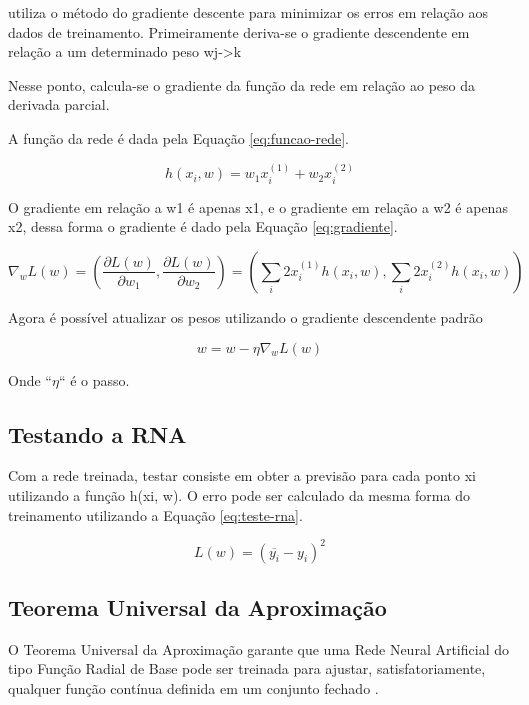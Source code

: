  utiliza o método do gradiente descente para minimizar os erros em relação aos dados de treinamento. Primeiramente deriva-se o gradiente descendente em relação a um determinado peso wj->k

Nesse ponto, calcula-se o gradiente da função da rede em relação ao peso da derivada parcial. 

A função da rede é dada pela Equação \ref{eq:funcao-rede}.

\begin{equation}
\label{eq:funcao-rede}
    h(x_i,w) = w_1x_i^{(1)} + w_2x_i^{(2)}
\end{equation}

O gradiente em relação a w1 é apenas x1, e o gradiente em relação a w2 é apenas x2, dessa forma o gradiente é dado pela Equação \ref{eq:gradiente}.

\begin{equation}
\label{eq:gradiente}
    \nabla_wL(w) = \left( \frac{\partial L(w)}{\partial w_1}, \frac{\partial L(w)}{\partial w_2} \right) = \left( \sum_i 2x_i ^{(1)} h(x_i,w), \sum_i 2x_i ^{(2)} h(x_i,w) \right)
\end{equation}

Agora é possível atualizar os pesos utilizando o gradiente descendente padrão

\begin{equation}
    w = w -\eta \nabla_w L(w)
\end{equation}

Onde ``$\eta$`` é o passo.

\subsection{Testando a RNA}

Com a rede treinada, testar consiste em obter a previsão para cada ponto xi utilizando a função h(xi, w). O erro pode ser calculado da mesma forma do treinamento utilizando a Equação \ref{eq:teste-rna}.

\begin{equation}
\label{eq:teste-rna}
    L(w) = (\overline{y_i} - y_i)^2
\end{equation}

\subsection{Teorema Universal da Aproximação}

O Teorema Universal da Aproximação garante que uma Rede Neural Artificial do tipo Função Radial de Base pode ser treinada para ajustar, satisfatoriamente, qualquer função contínua definida em um conjunto fechado \cite{neural-network}.